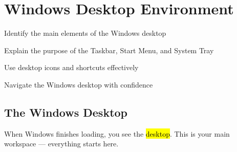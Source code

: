 
\chapter{Windows Desktop Environment}
\label{ch:desktop}

\begin{objectives}
  \item Identify the main elements of the Windows desktop
  \item Explain the purpose of the Taskbar, Start Menu, and System Tray
  \item Use desktop icons and shortcuts effectively
  \item Navigate the Windows desktop with confidence
\end{objectives}


\section{The Windows Desktop}
\label{sec:windows-desktop}

When Windows finishes loading, you see the \hl{desktop}. This is your main workspace --- everything starts here.


